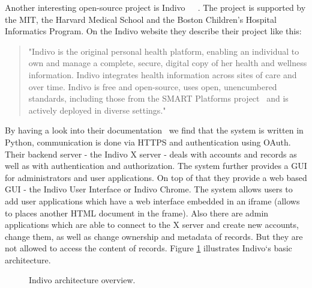 Another interesting open-source project is Indivo~\cite{indivohealth}~\cite{adida2010indivo}~\cite{mandl2007indivo}. The project is supported by the MIT, the Harvard Medical School and the Boston Children's Hospital Informatics Program. On the Indivo website they describe their project like this: 
\begin{quote}
"Indivo is the original personal health platform, enabling an individual to own and manage a complete, secure, digital copy of her health and wellness information. Indivo integrates health information across sites of care and over time. Indivo is free and open-source, uses open, unencumbered standards, including those from the SMART Platforms project~\cite{smart} and is actively deployed in diverse settings."
\end{quote}
By having a look into their documentation~\cite{indivoDoc} we find that the system is written in Python, communication is done via HTTPS and authentication using OAuth. Their backend server - the Indivo X server - deals with accounts and records as well as with authentication and authorization. The system further provides a GUI for administrators and user applications. On top of that they provide a web based GUI - the Indivo User Interface or Indivo Chrome. The system allows users to add user applications which have a web interface embedded in an iframe (allows to places another HTML document in the frame). Also there are admin applications which are able to connect to the X server and create new accounts, change them, as well as change ownership and metadata of records. But they are not allowed to access the content of records. Figure \ref{fig:indivoArch} illustrates Indivo`s basic architecture.

\begin{figure}[ht]
%
\caption{Indivo architecture overview.~\cite{indivoDoc}}
\label{fig:indivoArch}
\end{figure} 

